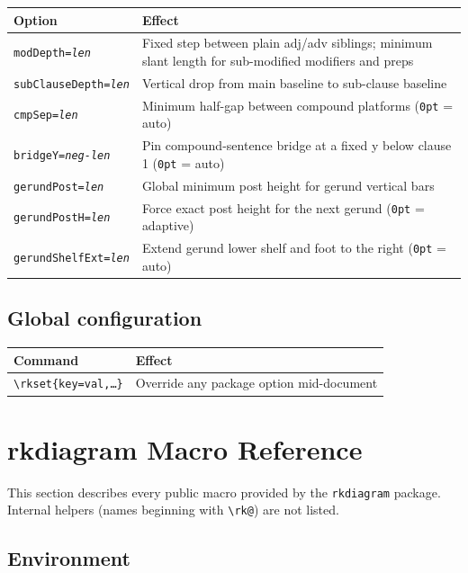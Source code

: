 \documentclass[11pt]{article}
\newcommand{\cmd}[1]{\texttt{\textbackslash #1}}
\newcommand{\opt}[1]{\texttt{#1}}
\begin{document}
\medskip
\begin{tabular}{@{}p{7cm}p{8cm}@{}}
  \toprule
  Option & Effect \\
  \midrule
  \opt{modDepth=\textit{len}}        & Fixed step between plain adj/adv siblings; minimum slant length for sub-modified modifiers and preps \\
  \opt{subClauseDepth=\textit{len}}  & Vertical drop from main baseline to sub-clause baseline \\
  \opt{cmpSep=\textit{len}}          & Minimum half-gap between compound platforms (\texttt{0pt} = auto) \\
  \opt{bridgeY=\textit{neg-len}}     & Pin compound-sentence bridge at a fixed y below clause 1 (\texttt{0pt} = auto) \\
  \opt{gerundPost=\textit{len}}      & Global minimum post height for gerund vertical bars \\
  \opt{gerundPostH=\textit{len}}     & Force exact post height for the next gerund (\texttt{0pt} = adaptive) \\
  \opt{gerundShelfExt=\textit{len}}  & Extend gerund lower shelf and foot to the right (\texttt{0pt} = auto) \\
  \bottomrule
\end{tabular}


\subsection*{Global configuration}

\medskip
\begin{tabular}{@{}p{7cm}p{8cm}@{}}
  \toprule
  Command & Effect \\
  \midrule
  \cmd{rkset\{key=val,\ldots\}} & Override any package option mid-document \\
  \bottomrule
\end{tabular}


\section{rkdiagram Macro Reference}

This section describes every public macro provided by the \texttt{rkdiagram} package.
Internal helpers (names beginning with \texttt{\textbackslash rk@}) are not listed.

\subsection*{Environment}
\end{document}

